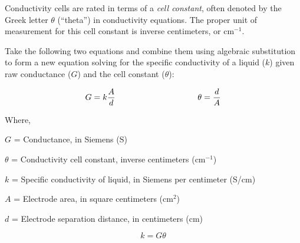 

Conductivity cells are rated in terms of a {\it cell constant}, often denoted by the Greek letter $\theta$ (``theta'') in conductivity equations.  The proper unit of measurement for this cell constant is inverse centimeters, or cm$^{-1}$.

Take the following two equations and combine them using algebraic substitution to form a new equation solving for the specific conductivity of a liquid ($k$) given raw conductance ($G$) and the cell constant ($\theta$):

$$G = k{A \over d} \hbox{\hskip 100pt} \theta = {d \over A}$$

\noindent
Where,

$G$ = Conductance, in Siemens (S)

$\theta$ = Conductivity cell constant, inverse centimeters (cm$^{-1}$)

$k$ = Specific conductivity of liquid, in Siemens per centimeter (S/cm)

$A$ = Electrode area, in square centimeters (cm$^{2}$)

$d$ = Electrode separation distance, in centimeters (cm)

\vskip 10pt







$$k = G \theta$$











